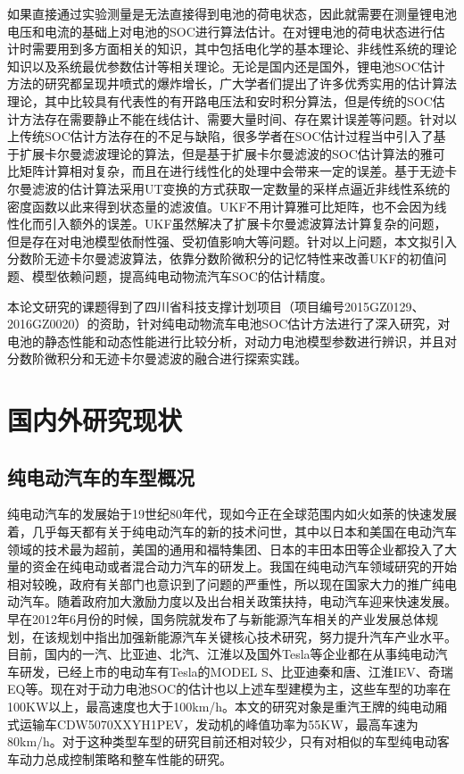 如果直接通过实验测量是无法直接得到电池的荷电状态，因此就需要在测量锂电池电压和电流的基础上对电池的SOC进行算法估计。在对锂电池的荷电状态进行估计时需要用到多方面相关的知识，其中包括电化学的基本理论、非线性系统的理论知识以及系统最优参数估计等相关理论。无论是国内还是国外，锂电池SOC估计方法的研究都呈现井喷式的爆炸增长，广大学者们提出了许多优秀实用的估计算法理论，其中比较具有代表性的有开路电压法和安时积分算法，但是传统的SOC估计方法存在需要静止不能在线估计、需要大量时间、存在累计误差等问题。针对以上传统SOC估计方法存在的不足与缺陷，很多学者在SOC估计过程当中引入了基于扩展卡尔曼滤波理论的算法，但是基于扩展卡尔曼滤波的SOC估计算法的雅可比矩阵计算相对复杂，而且在进行线性化的处理中会带来一定的误差。基于无迹卡尔曼滤波的估计算法采用UT变换的方式获取一定数量的采样点逼近非线性系统的密度函数以此来得到状态量的滤波值。UKF不用计算雅可比矩阵，也不会因为线性化而引入额外的误差。UKF虽然解决了扩展卡尔曼滤波算法计算复杂的问题，但是存在对电池模型依耐性强、受初值影响大等问题。针对以上问题，本文拟引入分数阶无迹卡尔曼滤波算法，依靠分数阶微积分的记忆特性来改善UKF的初值问题、模型依赖问题，提高纯电动物流汽车SOC的估计精度。

本论文研究的课题得到了四川省科技支撑计划项目（项目编号2015GZ0129、2016GZ0020）的资助，针对纯电动物流车电池SOC估计方法进行了深入研究，对电池的静态性能和动态性能进行比较分析，对动力电池模型参数进行辨识，并且对分数阶微积分和无迹卡尔曼滤波的融合进行探索实践。
\section{国内外研究现状}
	\subsection{纯电动汽车的车型概况}
	纯电动汽车的发展始于19世纪80年代，现如今正在全球范围内如火如荼的快速发展着，几乎每天都有关于纯电动汽车的新的技术问世，其中以日本和美国在电动汽车领域的技术最为超前，美国的通用和福特集团、日本的丰田本田等企业都投入了大量的资金在纯电动或者混合动力汽车的研发上。我国在纯电动汽车领域研究的开始相对较晚，政府有关部门也意识到了问题的严重性，所以现在国家大力的推广纯电动汽车。随着政府加大激励力度以及出台相关政策扶持，电动汽车迎来快速发展。早在2012年6月份的时候，国务院就发布了与新能源汽车相关的产业发展总体规划，在该规划中指出加强新能源汽车关键核心技术研究，努力提升汽车产业水平。目前，国内的一汽、比亚迪、北汽、江淮以及国外Tesla等企业都在从事纯电动汽车研发，已经上市的电动车有Tesla的MODEL S、比亚迪秦和唐、江淮IEV、奇瑞EQ等。现在对于动力电池SOC的估计也以上述车型建模为主，这些车型的功率在100KW以上，最高速度也大于100km/h。本文的研究对象是重汽王牌的纯电动厢式运输车CDW5070XXYH1PEV，发动机的峰值功率为55KW，最高车速为80km/h。对于这种类型车型的研究目前还相对较少，只有对相似的车型纯电动客车动力总成控制策略和整车性能的研究。
